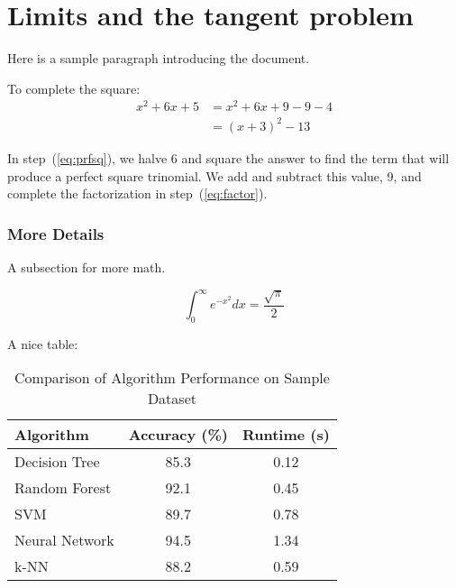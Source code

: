 \documentclass{article}
\begin{document}
\section{Limits and the tangent problem}

Here is a sample paragraph introducing the document.

\begin{example}
	To complete the square:
	\begin{align}
		x^2 + 6x + 5
		 & = x^2 + 6x + 9 - 9 - 4 \label{eq:prfsq} \\
		 & = (x + 3)^2 - 13 \label{eq:factor}
	\end{align}

	In step~(\ref{eq:prfsq}), we halve 6 and square the answer to find the term that will produce a perfect square trinomial.
	We add and subtract this value, 9, and complete the factorization in step~(\ref{eq:factor}).

\end{example}

\subsubsection*{More Details}

A subsection for more math.

\[
	\int_0^\infty e^{-x^2} dx = \frac{\sqrt{\pi}}{2}
\]

A nice table:

\begin{table}[htbp]
	\centering
	\caption{Comparison of Algorithm Performance on Sample Dataset}
	\label{tab:algo-performance}
	\vspace{5pt}
	\begin{tabular}{@{} l S[table-format=2.1] S[table-format=1.2] @{}}
		\toprule
		Algorithm      & {Accuracy (\%)} & {Runtime (s)} \\
		\midrule
		Decision Tree  & 85.3            & 0.12          \\
		Random Forest  & 92.1            & 0.45          \\
		SVM            & 89.7            & 0.78          \\
		Neural Network & 94.5            & 1.34          \\
		k-NN           & 88.2            & 0.59          \\
		\bottomrule
	\end{tabular}
\end{table}
\end{document}
